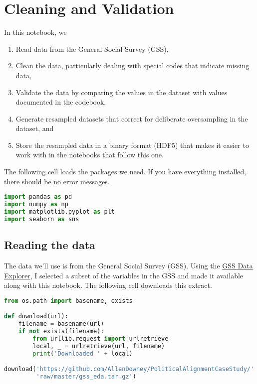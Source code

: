 \hypertarget{cleaning-and-validation}{%
\chapter{Cleaning and Validation}\label{cleaning-and-validation}}

In this notebook, we

\begin{enumerate}
\def\labelenumi{\arabic{enumi}.}
\item
  Read data from the General Social Survey (GSS),
\item
  Clean the data, particularly dealing with special codes that indicate
  missing data,
\item
  Validate the data by comparing the values in the dataset with values
  documented in the codebook.
\item
  Generate resampled datasets that correct for deliberate oversampling
  in the dataset, and
\item
  Store the resampled data in a binary format (HDF5) that makes it
  easier to work with in the notebooks that follow this one.
\end{enumerate}

The following cell loads the packages we need. If you have everything
installed, there should be no error messages.

\begin{lstlisting}[language=Python,style=source]
import pandas as pd
import numpy as np
import matplotlib.pyplot as plt
import seaborn as sns
\end{lstlisting}

\hypertarget{reading-the-data}{%
\section{Reading the data}\label{reading-the-data}}

The data we'll use is from the General Social Survey (GSS). Using the
\href{https://gssdataexplorer.norc.org/projects/52787}{GSS Data
Explorer}, I selected a subset of the variables in the GSS and made it
available along with this notebook. The following cell downloads this
extract.

\begin{lstlisting}[language=Python,style=source]
from os.path import basename, exists

def download(url):
    filename = basename(url)
    if not exists(filename):
        from urllib.request import urlretrieve
        local, _ = urlretrieve(url, filename)
        print('Downloaded ' + local)

download('https://github.com/AllenDowney/PoliticalAlignmentCaseStudy/' +
         'raw/master/gss_eda.tar.gz')
\end{lstlisting}

